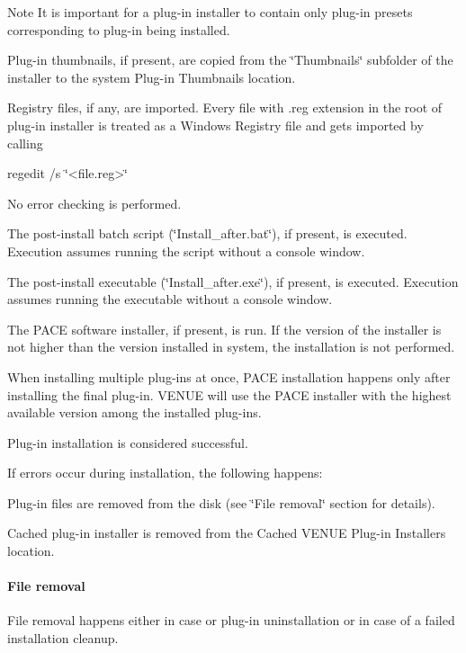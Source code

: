 \begin{DoxyEnumerate}
\begin{DoxyNote}{Note}
It is important for a plug-\/in installer to contain only plug-\/in presets corresponding to plug-\/in being installed.  
\end{DoxyNote}

\item Plug-\/in thumbnails, if present, are copied from the \char`\"{}\+Thumbnails\char`\"{} subfolder of the installer to the system Plug-\/in Thumbnails location.  
\item Registry files, if any, are imported. Every file with .reg extension in the root of plug-\/in installer is treated as a Windows Registry file and gets imported by calling

{\ttfamily regedit /s \char`\"{}<file.\+reg>\char`\"{}}

No error checking is performed.  
\item The post-\/install batch script (\char`\"{}\+Install\+\_\+after.\+bat\char`\"{}), if present, is executed. Execution assumes running the script without a console window.  
\item The post-\/install executable (\char`\"{}\+Install\+\_\+after.\+exe\char`\"{}), if present, is executed. Execution assumes running the executable without a console window.  
\item The P\+A\+CE software installer, if present, is run. If the version of the installer is not higher than the version installed in system, the installation is not performed.

When installing multiple plug-\/ins at once, P\+A\+CE installation happens only after installing the final plug-\/in. V\+E\+N\+UE will use the P\+A\+CE installer with the highest available version among the installed plug-\/ins.  
\item Plug-\/in installation is considered successful.  
\end{DoxyEnumerate}

 If errors occur during installation, the following happens\+: 
\begin{DoxyEnumerate}
\item Plug-\/in files are removed from the disk (see \char`\"{}\+File removal\char`\"{} section for details). 
\item Cached plug-\/in installer is removed from the Cached V\+E\+N\+UE Plug-\/in Installers location. 
\end{DoxyEnumerate}

\hypertarget{a00849_subsubsection__aax_venue_guide__system_details__plugin_installation__removal}{}\paragraph{File removal}\label{a00849_subsubsection__aax_venue_guide__system_details__plugin_installation__removal}
 File removal happens either in case or plug-\/in uninstallation or in case of a failed installation cleanup.

